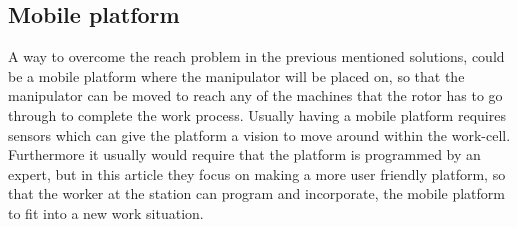 \subsection{Mobile platform}
A way to overcome the reach problem in the previous mentioned solutions, could be a mobile platform where the manipulator will be placed on, so that the manipulator can be moved to reach any of the machines that the rotor has to go through to complete the work process. Usually having a mobile platform requires sensors which can give the platform a vision to move around within the work-cell\cite{doi:10.1177/1729881417718588}. Furthermore it usually would require that the platform is programmed by an expert, but in this article \cite{doi:10.1177/1729881417718588} they focus on making a more user friendly platform, so that the worker at the station can program and incorporate, the mobile platform to fit into a new work situation.\\



